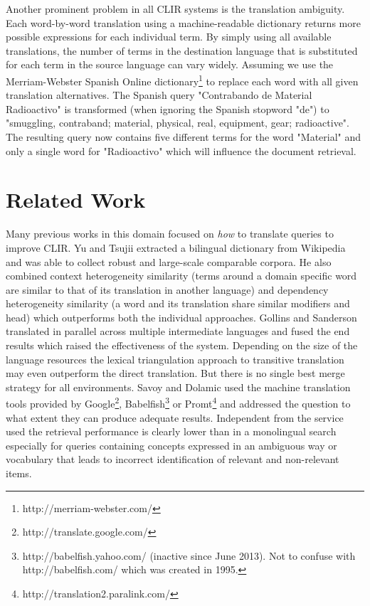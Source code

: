 \documentclass[journal]{IEEEtran}
\begin{document}
Another prominent problem in all CLIR systems is the translation ambiguity.
Each word-by-word translation using a machine-readable dictionary returns more possible expressions for each individual term.
By simply using all available translations, the number of terms in the destination language that is substituted for each term in the source language can vary widely.
Assuming we use the Merriam-Webster Spanish Online dictionary\footnote{http://merriam-webster.com/} to replace each word with all given translation alternatives.
The Spanish query "Contrabando de Material Radioactivo" is transformed (when ignoring the Spanish stopword "de") to "smuggling, contraband; material, physical, real, equipment, gear; radioactive".
The resulting query now contains five different terms for the word "Material" and only a single word for "Radioactivo" which will influence the document retrieval.




\section{Related Work}
Many previous works in this domain focused on \textit{how} to translate queries to improve CLIR.
Yu and Tsujii \cite{yu09} extracted a bilingual dictionary from Wikipedia and was able to collect robust and large-scale comparable corpora.
He also combined context heterogeneity similarity (terms around a domain specific word are similar to that of its translation in another language) and dependency heterogeneity similarity (a word and its translation share similar modifiers and head) which outperforms both the individual approaches.
Gollins and Sanderson \cite{gollins01} translated in parallel across multiple intermediate languages and fused the end results which raised the effectiveness of the system.
Depending on the size of the language resources the lexical triangulation approach to transitive translation may even outperform the direct translation.
But there is no single best merge strategy for all environments.
Savoy and Dolamic \cite{savoy09} used the machine translation tools provided by Google\footnote{http://translate.google.com/}, Babelfish\footnote{http://babelfish.yahoo.com/ (inactive since June 2013). Not to confuse with http://babelfish.com/ which was created in 1995.} or Promt\footnote{http://translation2.paralink.com/} and addressed the question to what extent they can produce adequate results.
Independent from the service used the retrieval performance is clearly lower than in a monolingual search especially for queries containing concepts expressed in an ambiguous way or vocabulary that leads to incorrect identification of relevant and non-relevant items.
\end{document}
